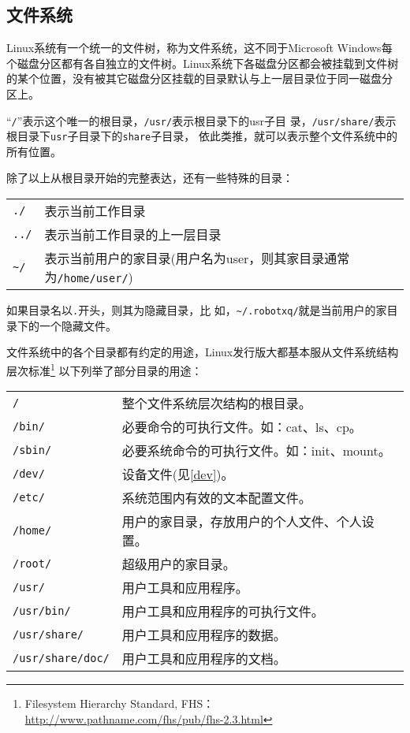 \documentclass[a4paper]{article}
\begin{document}
\subsection{文件系统}
Linux系统有一个统一的文件树，称为文件系统，这不同于Microsoft Windows每
个磁盘分区都有各自独立的文件树。Linux系统下各磁盘分区都会被挂载到文件树
的某个位置，没有被其它磁盘分区挂载的目录默认与上一层目录位于同一磁盘分
区上。

``\verb|/|''表示这个唯一的根目录，\verb|/usr/|表示根目录下的usr子目
录，\verb|/usr/share/|表示根目录下\verb|usr|子目录下的\verb|share|子目录，
依此类推，就可以表示整个文件系统中的所有位置。

除了以上从根目录开始的完整表达，还有一些特殊的目录：

\begin{center}
\begin{tabular}{p{3cm} p{8cm}}
  \hline
  \verb|./| &表示当前工作目录\\
  \verb|../|&表示当前工作目录的上一层目录\\
  \verb|~/|&表示当前用户的家目录(用户名为user，则其家目录通常为\verb|/home/user/|)\\
  \hline
\end{tabular}
\end{center}

如果目录名以\verb|.|开头，则其为隐藏目录，比
如，\verb|~/.robotxq/|就是当前用户的家目录下的一个隐藏文件。

文件系统中的各个目录都有约定的用途，Linux发行版大都基本服从文件系统结构
层次标准\footnote{Filesystem Hierarchy Standard,
  FHS：\url{http://www.pathname.com/fhs/pub/fhs-2.3.html}}
以下列举了部分目录的用途：

\begin{center}
\begin{tabular}{p{3cm} p{8cm}}
  \hline
  \verb|/|&整个文件系统层次结构的根目录。\\
  \verb|/bin/|&必要命令的可执行文件。如：cat、ls、cp。\\
  \verb|/sbin/|&必要系统命令的可执行文件。如：init、mount。\\
  \verb|/dev/|&设备文件(见\ref{dev})。\\
  \verb|/etc/|&系统范围内有效的文本配置文件。\\
  \verb|/home/|&用户的家目录，存放用户的个人文件、个人设置。\\
  \verb|/root/|&超级用户的家目录。\\
  \verb|/usr/|&用户工具和应用程序。\\
  \verb|/usr/bin/|&用户工具和应用程序的可执行文件。\\
  \verb|/usr/share/|&用户工具和应用程序的数据。\\
  \verb|/usr/share/doc/|&用户工具和应用程序的文档。\\
  \hline
\end{tabular}
\end{center}
\end{document}
